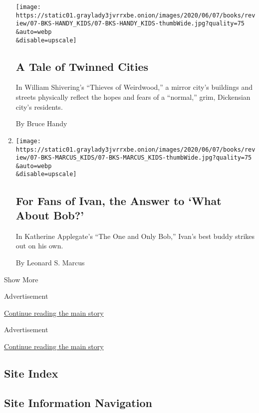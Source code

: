 \begin{enumerate}
  \texttt{[image: https://static01.graylady3jvrrxbe.onion/images/2020/06/07/books/review/07-BKS-HANDY\_KIDS/07-BKS-HANDY\_KIDS-thumbWide.jpg?quality=75\\\&auto=webp\\\&disable=upscale]}

  \hypertarget{a-tale-of-twinned-cities}{%
  \subsection{A Tale of Twinned Cities}\label{a-tale-of-twinned-cities}}

  In William Shivering's ``Thieves of Weirdwood,'' a mirror city's
  buildings and streets physically reflect the hopes and fears of a
  ``normal,'' grim, Dickensian city's residents.

  By Bruce Handy
\item
  \href{/2020/05/30/books/review/katherine-applegate-the-one-and-only-bob.html}{}

  \texttt{[image: https://static01.graylady3jvrrxbe.onion/images/2020/06/07/books/review/07-BKS-MARCUS\_KIDS/07-BKS-MARCUS\_KIDS-thumbWide.jpg?quality=75\\\&auto=webp\\\&disable=upscale]}

  \hypertarget{for-fans-of-ivan-the-answer-to-what-about-bob}{%
  \subsection{For Fans of Ivan, the Answer to `What About
  Bob?'}\label{for-fans-of-ivan-the-answer-to-what-about-bob}}

  In Katherine Applegate's ``The One and Only Bob,'' Ivan's best buddy
  strikes out on his own.

  By Leonard S. Marcus
\end{enumerate}

Show More

Advertisement

\protect\hyperlink{after-mid2}{Continue reading the main story}

Advertisement

\protect\hyperlink{after-mktg}{Continue reading the main story}

\hypertarget{site-index}{%
\subsection{Site Index}\label{site-index}}

\hypertarget{site-information-navigation}{%
\subsection{Site Information
Navigation}\label{site-information-navigation}}

